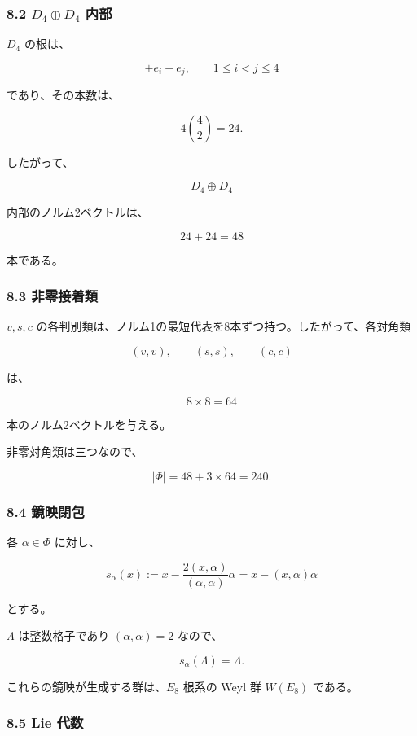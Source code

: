 \documentclass[
  a4paper,
  ja=minimal,
  xelatex,
  paragraph-mark={},
]{bxjsarticle}
\begin{document}
\subsubsection{\texorpdfstring{8.2 \(D_4\oplus D_4\)
内部}{8.2 D\_4\textbackslash oplus D\_4 内部}}\label{d_4oplus-d_4-ux5185ux90e8}

\(D_4\) の根は、

\[
\pm e_i\pm e_j,
\qquad
1\le i<j\le4
\]

であり、その本数は、

\[
4
\binom42
{}=24.
\]

したがって、

\[
D_4\oplus D_4
\]

内部のノルム2ベクトルは、

\[
24+24=48
\]

本である。

\subsubsection{8.3 非零接着類}\label{ux975eux96f6ux63a5ux7740ux985e}

\(v,s,c\)
の各判別類は、ノルム1の最短代表を8本ずつ持つ。したがって、各対角類

\[
(v,v),
\qquad
(s,s),
\qquad
(c,c)
\]

は、

\[
8\times8=64
\]

本のノルム2ベクトルを与える。

非零対角類は三つなので、

\[
\boxed{
|\Phi|
{}=
48
{}+3\times64
{}=240.
}
\]

\subsubsection{8.4 鏡映閉包}\label{ux93e1ux6620ux9589ux5305}

各 \(\alpha\in\Phi\) に対し、

\[
s_\alpha(x)
:=
x
{}-\frac{2(x,\alpha)}
{(\alpha,\alpha)}
\alpha
{}=
x-(x,\alpha)\alpha
\]

とする。

\(\Lambda\) は整数格子であり \((\alpha,\alpha)=2\) なので、

\[
s_\alpha(\Lambda)
{}=
\Lambda.
\]

これらの鏡映が生成する群は、\(E_8\) 根系の Weyl 群 \(W(E_8)\) である。

\subsubsection{8.5 Lie 代数}\label{lie-ux4ee3ux6570}
\end{document}
